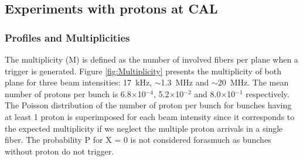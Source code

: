 \documentclass[a4paper,11pt]{article}
\begin{document}
\subsection{Experiments with protons at CAL}
\subsubsection{Profiles and Multiplicities}
\label{Profiles_And_Multiplies}
The multiplicity (M) is defined as the number of involved fibers per plane when a trigger is generated.
Figure \ref{fig:Multiplicity} presents the multiplicity of both plane for three beam intensities: 17~kHz, $\sim$1.3~MHz and $\sim$20~MHz. The mean number of protons per bunch is 6.8$\times$10$^{-4}$, 5.2$\times$10$^{-2}$ and 8.0$\times$10$^{-1}$ respectively. The Poisson distribution of the number of proton per bunch for bunches having at least 1 proton is superimposed for each beam intensity since it corresponds to the expected multiplicity if we neglect the multiple proton arrivals in a single fiber. The probability P for X = 0 is not considered forasmuch as bunches without proton do not trigger. \\
\end{document}
